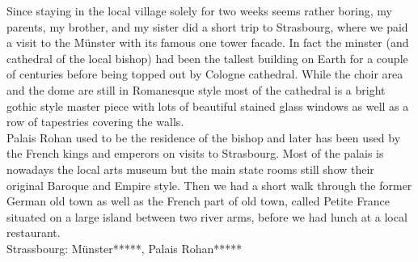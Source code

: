Since staying in the local village solely for two weeks seems rather boring, my parents, my brother, and my sister did a short trip to Strasbourg, where we paid a visit to the M\"unster with its famous one tower facade. In fact the minster (and cathedral of the local bishop) had been the tallest building on Earth for a couple of centuries before being topped out by Cologne cathedral. While the choir area and the dome are still in Romanesque style most of the cathedral is a bright gothic style master piece with lots of beautiful stained glass windows as well as a row of tapestries covering the walls.\\
Palais Rohan used to be the residence of the bishop and later has been used by the French kings and emperors on visits to Strasbourg. Most of the palais is nowadays the local arts museum but the main state rooms still show their original Baroque and Empire style. Then we had a short walk through the former German old town as well as the French part of old town, called Petite France situated on a large island between two river arms, before we had lunch at a local restaurant.\\

Strassbourg: M\"unster*****, Palais Rohan*****